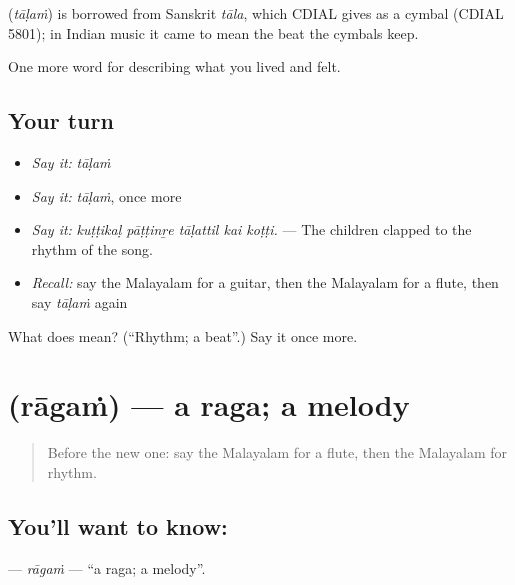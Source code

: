 \begin{cousinweb}
\textbf{} (\emph{tāḷaṁ}) is borrowed from Sanskrit \emph{tāla}, which CDIAL gives as a cymbal (CDIAL 5801); in Indian music it came to mean the beat the cymbals keep.
\end{cousinweb}

\begin{grammarlens}[title={What you've built}]
One more word for describing what you lived and felt.
\end{grammarlens}

\subsection*{Your turn}
\begin{itemize}
\raggedright
  \item \emph{Say it:} \emph{tāḷaṁ}
  \item \emph{Say it:} \emph{tāḷaṁ}, once more
  \item \emph{Say it:} \emph{kuṭṭikaḷ pāṭṭinṟe tāḷattil kai koṭṭi.} — The children clapped to the rhythm of the song.
  \item \emph{Recall:} say the Malayalam for a guitar, then the Malayalam for a flute, then say \emph{tāḷaṁ} again
\end{itemize}

\begin{tcolorbox}[breakable,colback=teal!4,colframe=teal!35!black,title={Before you move on}]
What does  mean? (\textquotedblleft{}Rhythm; a beat\textquotedblright{}.) Say it once more.
\end{tcolorbox}
\section[\texorpdfstring{\ml{രാഗം} (rāgaṁ)}{രാഗം (rāgaṁ)}]{ (rāgaṁ) — a raga; a melody}

\label{lesson:ML-C562-ragam}



\begin{quote}
Before the new one: say the Malayalam for a flute, then the Malayalam for rhythm.
\end{quote}

\subsection*{You'll want to know: }
\textbf{} — \emph{rāgaṁ} — \textquotedblleft{}a raga; a melody\textquotedblright{}.

